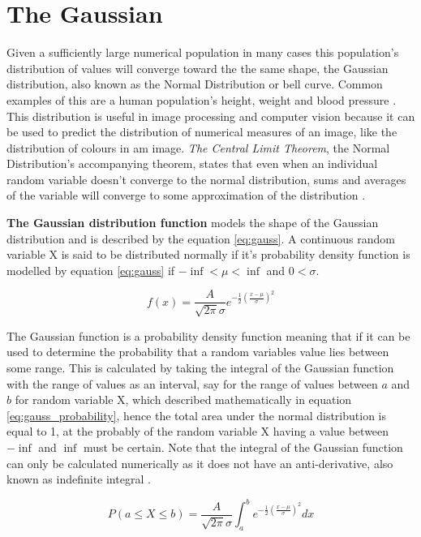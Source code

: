 \section{The Gaussian}
\label{section:gaussian}

Given a sufficiently large numerical population in many cases this population's distribution of values will converge toward the the same shape, the Gaussian distribution, also known as the Normal Distribution or bell curve. Common examples of this are a human population's height, weight and blood pressure \cite{modern_statistics}. This distribution is useful in image processing and computer vision because it can be used to predict the distribution of numerical measures of an image, like the distribution of colours in am image. \emph{The Central Limit Theorem}, the Normal Distribution's accompanying theorem, states that even when an individual random variable doesn't converge to the normal distribution, sums and averages of the variable will converge to some approximation of the distribution \cite{modern_statistics}. 

\textbf{The Gaussian distribution function} models the shape of the Gaussian distribution and is described by the equation \ref{eq:gauss}. A continuous random variable X is said to be distributed normally if it's probability density function is modelled by equation \ref{eq:gauss} if $-\inf < \mu < \inf$ and $0 < \sigma$.


\begin{equation}
  f(x) = \frac{A}{\sqrt{2\pi}\sigma}e^{-\frac{1}{2}(\frac{x-\mu}{\sigma})^2}
\label{eq:gauss}
\end{equation}

The Gaussian function is a probability density function meaning that if it can be used to determine the probability that a random variables value lies between some range. This is calculated by taking the integral of the Gaussian function with the range of values as an interval, say for the range of values between $a$ and $b$ for random variable X, which described mathematically in equation \ref{eq:gauss_probability}, hence the total area under the normal distribution is equal to 1, at the probably of the random variable X having a value between $-\inf$ and $\inf$ must be certain. Note that the integral of the Gaussian function can only be calculated numerically as it does not have an anti-derivative, also known as indefinite integral \cite{antiderivatives}. 

\begin{equation}
  P(a \leq X \leq b) = \frac{A}{\sqrt{2\pi}\sigma}\int_{a}^{b}e^{-\frac{1}{2}(\frac{x-\mu}{\sigma})^2}dx
\label{eq:gauss_probability}
\end{equation}

